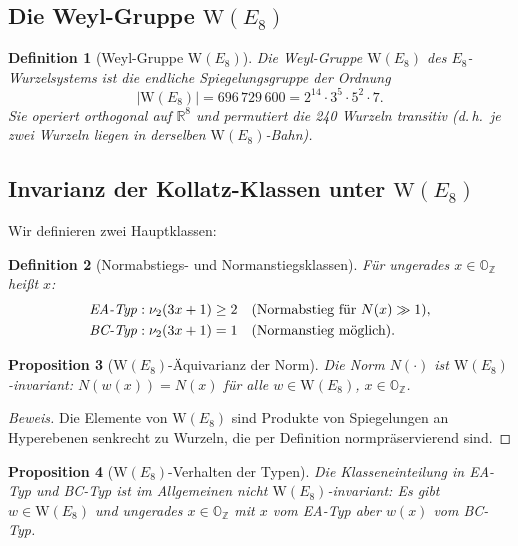 \documentclass[12pt,a4paper]{article}
\newtheorem{definition}{Definition}[section]
\newtheorem{proposition}[definition]{Proposition}
\newenvironment{beweis}{\begin{proof}[Beweis]}{\end{proof}}
\newcommand{\vii}{\nu_2}           %
\newcommand{\OZ}{\mathbb{O}_{\mathbb{Z}}}  %
\newcommand{\Norm}[1]{N(#1)}       %
\newcommand{\WE}{\mathrm{W}(E_8)}  %
\newcommand{\R}{\mathbb{R}}
\begin{document}
\subsection{Die Weyl-Gruppe \texorpdfstring{$\WE$}{W(E8)}}

\begin{definition}[Weyl-Gruppe $\WE$]
Die \emph{Weyl-Gruppe} $\WE$ des $E_8$-Wurzelsystems ist die
endliche Spiegelungsgruppe der Ordnung
\[
  |\WE| = 696\,729\,600 = 2^{14} \cdot 3^5 \cdot 5^2 \cdot 7.
\]
Sie operiert orthogonal auf $\R^8$ und permutiert die 240 Wurzeln transitiv
(d.\,h.\ je zwei Wurzeln liegen in derselben $\WE$-Bahn).
\end{definition}

\subsection{Invarianz der Kollatz-Klassen unter \texorpdfstring{$\WE$}{W(E8)}}

Wir definieren zwei Hauptklassen:

\begin{definition}[Normabstiegs- und Normanstiegsklassen]
Für ungerades $x \in \OZ$ heißt $x$:
\begin{align*}
  \text{\emph{EA-Typ}} &: \vii(3x+1) \geq 2 \quad (\text{Normabstieg für } \Norm{x} \gg 1),\\
  \text{\emph{BC-Typ}} &: \vii(3x+1) = 1 \quad (\text{Normanstieg möglich}).
\end{align*}
\end{definition}

\begin{proposition}[$\WE$-Äquivarianz der Norm]\label{prop:wequivarianz}
Die Norm $\Norm{\cdot}$ ist $\WE$-invariant: $\Norm{w(x)} = \Norm{x}$
für alle $w \in \WE$, $x \in \OZ$.
\end{proposition}

\begin{beweis}
Die Elemente von $\WE$ sind Produkte von Spiegelungen an Hyperebenen
senkrecht zu Wurzeln, die per Definition normpräservierend sind.
\end{beweis}

\begin{proposition}[$\WE$-Verhalten der Typen]\label{prop:we-typen}
Die Klasseneinteilung in EA-Typ und BC-Typ ist im Allgemeinen
\emph{nicht} $\WE$-invariant: Es gibt $w \in \WE$ und ungerades
$x \in \OZ$ mit $x$ vom EA-Typ aber $w(x)$ vom BC-Typ.
\end{proposition}
\end{document}
